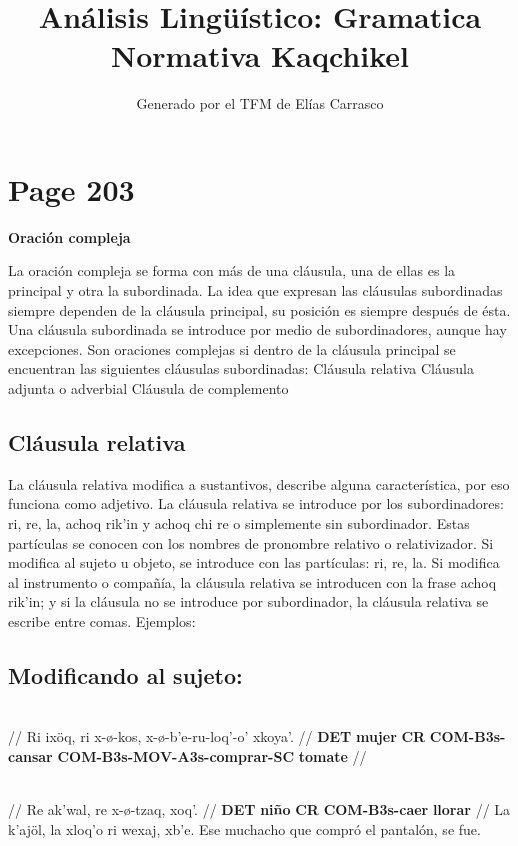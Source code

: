 \documentclass{article}%
\title{Análisis Lingüístico: Gramatica Normativa Kaqchikel}%
\author{Generado por el TFM de Elías Carrasco}%
\begin{document}
%
\normalsize%
\maketitle%
\section{Page 203}%
\label{sec:Page203}%
\centerline{\textbf{Oración compleja}}%
La oración compleja se forma con más de una cláusula, una de ellas es la principal y %
otra la subordinada. La idea que expresan las cláusulas subordinadas siempre dependen %
de la cláusula principal, su posición es siempre después de ésta. Una cláusula subordinada %
se introduce por medio de subordinadores, aunque hay excepciones. Son oraciones %
complejas si dentro de la cláusula principal se encuentran las siguientes cláusulas %
subordinadas: %
Cláusula relativa %
Cláusula adjunta o adverbial %
Cláusula de complemento %
\subsection{Cláusula relativa}%
\label{subsec:Clusularelativa}%

%
La cláusula relativa modifica a sustantivos, describe alguna característica, por eso %
funciona como adjetivo. La cláusula relativa se introduce por los subordinadores: ri, %
re, la, achoq rik'in y achoq chi re o simplemente sin subordinador. Estas partículas se %
conocen con los nombres de pronombre relativo o relativizador. Si modifica al sujeto u %
objeto, se introduce con las partículas: ri, re, la. Si modifica al instrumento o compañía, %
la cláusula relativa se introducen con la frase achoq rik'in; y si la cláusula no se %
introduce por subordinador, la cláusula relativa se escribe entre comas. Ejemplos: %
\subsection{Modificando al sujeto:}%
\label{subsec:Modificandoalsujeto}%

%
\par\medskip%
\ex
\textit{} \\
\begingl
\gla  //
\glb Ri ixöq, ri x-ø-kos, x-ø-b'e-ru-loq'-o' xkoya'. //
\glc \textbf{DET} \textbf{mujer} \textbf{CR} \textbf{COM-B3s-cansar} \textbf{COM-B3s-MOV-A3s-comprar-SC} \textbf{tomate} //
\endgl
\xe
%
\medskip%
\par\medskip%
\ex
\textit{} \\
\begingl
\gla  //
\glb Re ak'wal, re x-ø-tzaq, xoq'. //
\glc \textbf{DET} \textbf{niño} \textbf{CR} \textbf{COM-B3s-caer} \textbf{llorar} //
\endgl
\xe
%
\medskip%
La k'ajöl, la xloq'o ri wexaj, xb'e. %
Ese muchacho que compró el pantalón, se fue. 

%
\end{document}
